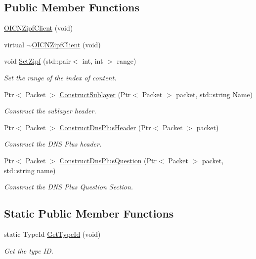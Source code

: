 \subsection*{Public Member Functions}
\begin{DoxyCompactItemize}
\item 
\hyperlink{classns3_1_1OICNZipfClient_ad408bc6446376318703b8e001d99a97f}{O\-I\-C\-N\-Zipf\-Client} (void)
\item 
virtual \hyperlink{classns3_1_1OICNZipfClient_a3f6cd458cc6a987da49699932c38b9bc}{$\sim$\-O\-I\-C\-N\-Zipf\-Client} (void)
\item 
void \hyperlink{classns3_1_1OICNZipfClient_a61c4940713bdd9363b8313696b2c4ffa}{Set\-Zipf} (std\-::pair$<$ int, int $>$ range)
\begin{DoxyCompactList}\small\item\em Set the range of the index of content. \end{DoxyCompactList}\item 
Ptr$<$ Packet $>$ \hyperlink{classns3_1_1OICNZipfClient_a4a76b1b9373eb3bb7e43970222def563}{Construct\-Sublayer} (Ptr$<$ Packet $>$ packet, std\-::string Name)
\begin{DoxyCompactList}\small\item\em Construct the sublayer header. \end{DoxyCompactList}\item 
Ptr$<$ Packet $>$ \hyperlink{classns3_1_1OICNZipfClient_ade9706357b84a74244249284e6da73cb}{Construct\-Dns\-Plus\-Header} (Ptr$<$ Packet $>$ packet)
\begin{DoxyCompactList}\small\item\em Construct the D\-N\-S Plus header. \end{DoxyCompactList}\item 
Ptr$<$ Packet $>$ \hyperlink{classns3_1_1OICNZipfClient_a966298b46754229776f3536e80fcff57}{Construct\-Dns\-Plus\-Question} (Ptr$<$ Packet $>$ packet, std\-::string name)
\begin{DoxyCompactList}\small\item\em Construct the D\-N\-S Plus Question Section. \end{DoxyCompactList}\end{DoxyCompactItemize}
\subsection*{Static Public Member Functions}
\begin{DoxyCompactItemize}
\item 
static Type\-Id \hyperlink{classns3_1_1OICNZipfClient_afe8d27ae680ce9efbe3006013ff3adf5}{Get\-Type\-Id} (void)
\begin{DoxyCompactList}\small\item\em Get the type I\-D. \end{DoxyCompactList}\end{DoxyCompactItemize}
